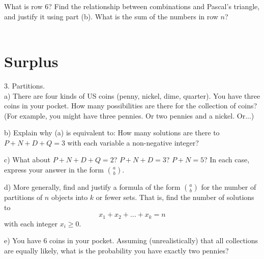 \documentclass[12pt]{article}
\begin{document}
What is row 6?  Find the relationship between combinations and Pascal's triangle, and justify it using part (b).  What is the sum of the numbers in row $n$? \\ \\

\newpage

\section{Surplus}

3. Partitions. \\
a) There are four kinds of US coins (penny, nickel, dime, quarter).  You have three coins in your pocket.  How many possibilities are there for the collection of coins?  (For example, you might have three pennies.  Or two pennies and a nickel. Or...)

b) Explain why (a) is equivalent to: How many solutions are there to $P + N + D + Q = 3$ with each variable a non-negative integer?

c) What about $P+N+D+Q=2$? $P + N + D  = 3$?  $P + N = 5$?  In each case, express your answer in the form $\binom{a}{b}$.

d) More generally, find and justify a formula of the form $\binom{a}{b}$ for the number of partitions of $n$ objects into $k$ or fewer sets.  That is, find the number of solutions to $$x_1 + x_2 + \dots + x_k = n$$ with each integer $x_i \geq 0$.

e) You have 6 coins in your pocket.  Assuming (unrealistically) that all collections are equally likely, what is the probability you have exactly two pennies?
\end{document}
